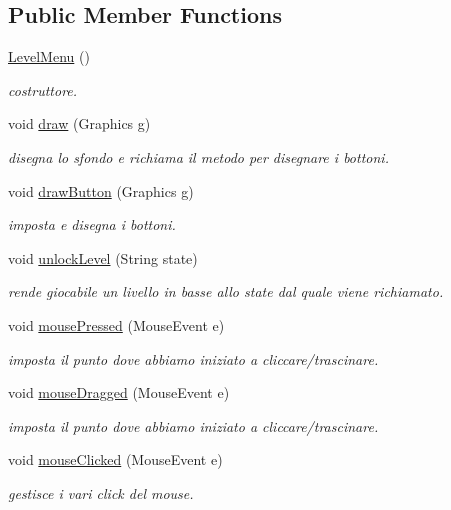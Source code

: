 \subsection*{Public Member Functions}
\begin{DoxyCompactItemize}
\item 
\hyperlink{classui_1_1_level_menu_a08d3dc37d2a120ac517986d021c999c0}{Level\+Menu} ()
\begin{DoxyCompactList}\small\item\em costruttore. \end{DoxyCompactList}\item 
void \hyperlink{classui_1_1_level_menu_a72fe1ffca978e99fd16994a10e7f8051}{draw} (Graphics g)
\begin{DoxyCompactList}\small\item\em disegna lo sfondo e richiama il metodo per disegnare i bottoni. \end{DoxyCompactList}\item 
void \hyperlink{classui_1_1_level_menu_a65768678909bc0512c6cb9780709ad38}{draw\+Button} (Graphics g)
\begin{DoxyCompactList}\small\item\em imposta e disegna i bottoni. \end{DoxyCompactList}\item 
void \hyperlink{classui_1_1_level_menu_a90a96ba9679b7df9cc591d4c58430615}{unlock\+Level} (String state)
\begin{DoxyCompactList}\small\item\em rende giocabile un livello in basse allo state dal quale viene richiamato. \end{DoxyCompactList}\item 
void \hyperlink{classui_1_1_level_menu_aed82e1ce3dd3cf283d508c3ba3be70ef}{mouse\+Pressed} (Mouse\+Event e)
\begin{DoxyCompactList}\small\item\em imposta il punto dove abbiamo iniziato a cliccare/trascinare. \end{DoxyCompactList}\item 
void \hyperlink{classui_1_1_level_menu_adbfc0588c017133c9b7070474402b72f}{mouse\+Dragged} (Mouse\+Event e)
\begin{DoxyCompactList}\small\item\em imposta il punto dove abbiamo iniziato a cliccare/trascinare. \end{DoxyCompactList}\item 
void \hyperlink{classui_1_1_level_menu_a45d56bd84238e8b56589dfc732e2b2cf}{mouse\+Clicked} (Mouse\+Event e)
\begin{DoxyCompactList}\small\item\em gestisce i vari click del mouse. \end{DoxyCompactList}\end{DoxyCompactItemize}
